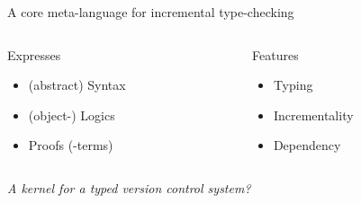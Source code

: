 \documentclass[ignorenonframetext,red]{beamer}
\begin{document}
\begin{frame}{A core meta-language for incremental type-checking}
  \begin{columns}[t]
    \begin{column}{0.5\textwidth}
      \begin{block}{Expresses}
        \begin{itemize}
        \item (abstract) Syntax
        \item (object-) Logics
        \item Proofs (-terms)
        \end{itemize}
      \end{block}
    \end{column}
    \begin{column}{0.5\textwidth}
      \begin{block}{Features}
        \begin{itemize}
        \item Typing
        \item Incrementality
        \item Dependency
        \end{itemize}
      \end{block}
    \end{column}
  \end{columns}
  \vspace{2em}
  \begin{center}
    \emph{A kernel for a typed version control system?}
  \end{center}
\end{frame}
\end{document}
